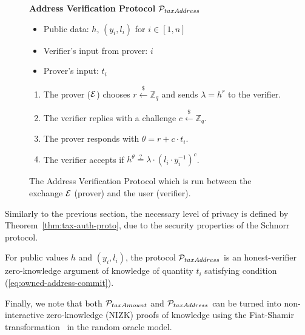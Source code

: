 \begin{figure}[h]
\begin{mdframed}

\begin{center}
    \textbf{Address Verification Protocol} $\mathcal{P}_{taxAddress}$
\end{center}

    \begin{itemize}
        \item Public data: $h$, $(y_i, l_i)$ for $i \in [1, n]$
        \item Verifier's input from prover: $i$
        \item Prover's input: $t_i$
    \end{itemize}

    \begin{enumerate}
        \item The prover ($\mathcal{E}$) chooses $r \xleftarrow{\$} \mathbb{Z}_q$
            and sends $\lambda = h^r$ to the verifier.
        \item The verifier replies with a challenge $c \xleftarrow{\$} \mathbb{Z}_q$.
        \item The prover responds with $\theta = r + c \cdot t_i$.
        \item The verifier accepts if $h^\theta \stackrel{?}{=} \lambda \cdot (l_i \cdot y_i^{-1})^c$.
    \end{enumerate}

\end{mdframed}
\caption{
    The Address Verification Protocol which is run between the exchange $\mathcal{E}$
    (prover) and the user (verifier).
}
\label{fig:taxation_verification_proto}
\end{figure}

Similarly to the previous section, the necessary level of privacy is defined by
Theorem~\ref{thm:tax-auth-proto}, due to the security properties of the Schnorr
protocol.

\begin{theorem}
    For public values $h$ and $(y_i, l_i)$, the protocol
    $\mathcal{P}_{taxAddress}$ is an honest-verifier zero-knowledge argument of
    knowledge of quantity $t_i$ satisfying condition (\ref{eq:owned-address-commit}).
\end{theorem}

Finally, we note that both $\mathcal{P}_{taxAmount}$ and $\mathcal{P}_{taxAddress}$ can be
turned into non-interactive zero-knowledge (NIZK) proofs of knowledge using the
Fiat-Shamir transformation~\cite{C:FiaSha86} in the random oracle model.
